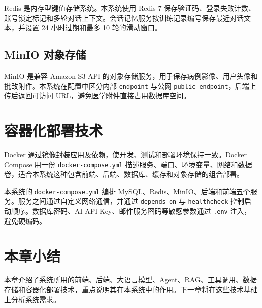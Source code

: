 Redis 是内存型键值存储系统\cite{redis2024}。本系统使用 Redis 7 保存验证码、登录失败计数、账号锁定标记和多轮对话上下文。会话记忆服务按训练记录编号保存最近对话文本，并设置 24 小时过期和最多 10 轮的滑动窗口。

\subsection{MinIO 对象存储}

MinIO 是兼容 Amazon S3 API 的对象存储服务\cite{minio2024}，用于保存病例影像、用户头像和批改附件。本系统在配置中区分内部 \texttt{endpoint} 与公网 \texttt{public-endpoint}，后端上传后返回可访问 URL，避免医学附件直接占用数据库空间。

\section{容器化部署技术}

Docker 通过镜像封装应用及依赖，使开发、测试和部署环境保持一致\cite{merkel2014docker}。Docker Compose 用一份 \texttt{docker-compose.yml} 描述服务、端口、环境变量、网络和数据卷，适合本系统这种包含前端、后端、数据库、缓存和对象存储的组合部署。

本系统的 \texttt{docker-compose.yml} 编排 MySQL、Redis、MinIO、后端和前端五个服务。服务之间通过自定义网络通信，并通过 \texttt{depends\_on} 与 \texttt{healthcheck} 控制启动顺序。数据库密码、AI API Key、邮件服务密码等敏感参数通过 \texttt{.env} 注入，避免硬编码。

\section{本章小结}

本章介绍了系统所用的前端、后端、大语言模型、Agent、RAG、工具调用、数据存储和容器化部署技术，重点说明其在本系统中的作用。下一章将在这些技术基础上分析系统需求。
